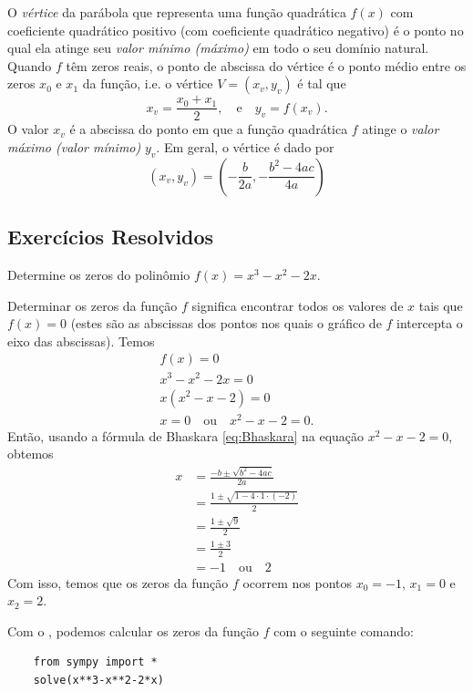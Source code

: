 O \emph{vértice} da parábola que representa uma função quadrática $f(x)$ com coeficiente quadrático positivo (com coeficiente quadrático negativo) é o ponto no qual ela atinge seu \emph{valor mínimo (máximo)} em todo o seu domínio natural. Quando $f$ têm zeros reais, o ponto de abscissa do vértice é o ponto médio entre os zeros $x_0$ e $x_1$ da função, i.e. o vértice $V = (x_v, y_v)$ é tal que
\begin{equation}
  x_v = \frac{x_0 + x_1}{2},\quad\text{e}\quad y_v = f(x_v). 
\end{equation}
O valor $x_v$ é a abscissa do ponto em que a função quadrática $f$ atinge o \emph{valor máximo (valor mínimo)} $y_v$. Em geral, o vértice é dado por
\begin{equation}
  (x_v,y_v) = \left(-\frac{b}{2a},-\frac{b^2-4ac}{4a}\right)
\end{equation}

\subsection*{Exercícios Resolvidos}

\begin{exeresol}
  Determine os zeros do polinômio $f(x) = x^3-x^2-2x$.
\end{exeresol}
\begin{resol}
  Determinar os zeros da função $f$ significa encontrar todos os valores de $x$ tais que $f(x)=0$ (estes são as abscissas dos pontos nos quais o gráfico de $f$ intercepta o eixo das abscissas). Temos
  \begin{gather}
    f(x)=0\\
    x^3-x^2-2x=0\\
    x(x^2-x-2)=0\\
    x=0\quad\text{ou}\quad x^2-x-2=0.
  \end{gather}
  Então, usando a fórmula de Bhaskara \eqref{eq:Bhaskara} na equação $x^2-x-2=0$, obtemos
  \begin{align}
    x &= \frac{-b\pm\sqrt{b^2-4ac}}{2a} \\
      &= \frac{1\pm\sqrt{1-4\cdot 1\cdot (-2)}}{2}\\
      &= \frac{1\pm\sqrt{9}}{2}\\
      &= \frac{1\pm 3}{2}\\
      &= -1\quad\text{ou}\quad 2
  \end{align}
  Com isso, temos que os zeros da função $f$ ocorrem nos pontos $x_0 = -1$, $x_1=0$ e $x_2=2$.

  \ifispython
  Com o {\sympy}, podemos calcular os zeros da função $f$ com o seguinte comando:
  \begin{lstlisting}
    from sympy import *
    solve(x**3-x**2-2*x)
  \end{lstlisting}
  \fi
\end{resol}

